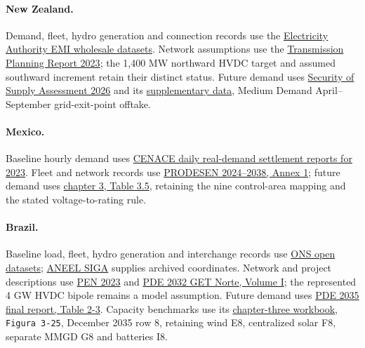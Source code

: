\documentclass[pdflatex,sn-nature]{sn-jnl}
\begin{document}
\begin{appendices}
\paragraph{New Zealand.} Demand, fleet, hydro generation and connection records use the \href{https://www.emi.ea.govt.nz/Wholesale/Datasets}{Electricity Authority EMI wholesale datasets}. Network assumptions use the \href{https://static.transpower.co.nz/public/uncontrolled_docs/TPR\%202023\%20-\%20Complete.pdf}{Transmission Planning Report 2023}; the 1,400 MW northward HVDC target and assumed southward increment retain their distinct status. Future demand uses \href{https://static.transpower.co.nz/public/bulk-upload/documents/2026\%20SOSA\%20-\%20Final\%20Report.pdf?VersionId=Lp87J8gdqEEv1qiWPGOQrC6ax06BixFp}{Security of Supply Assessment 2026} and its \href{https://static.transpower.co.nz/public/bulk-upload/documents/2026\%20SOSA\%20-\%20Final\%20Supplementary\%20Data\%20-\%20Final\%20Version.xlsx?VersionId=U0jsFRXOz4d2ZmYgOFSYhlm9bRI.pgzm}{supplementary data}, Medium Demand April--September grid-exit-point offtake.

\paragraph{Mexico.} Baseline hourly demand uses \href{https://www.cenace.gob.mx/Paginas/SIM/Reportes/EstimacionDemandaReal.aspx}{CENACE daily real-demand settlement reports for 2023}. Fleet and network records use \href{http://base.energia.gob.mx/PRODESEN2024/prodesen24-38A1.PDF}{PRODESEN 2024--2038, Annex 1}; future demand uses \href{http://base.energia.gob.mx/PRODESEN2024/prodesen24-38cap3.PDF}{chapter 3, Table 3.5}, retaining the nine control-area mapping and the stated voltage-to-rating rule.

\paragraph{Brazil.} Baseline load, fleet, hydro generation and interchange records use \href{https://dados.ons.org.br/}{ONS open datasets}; \href{https://dadosabertos.aneel.gov.br/dataset/siga-sistema-de-informacoes-de-geracao-da-aneel}{ANEEL SIGA} supplies archived coordinates. Network and project descriptions use \href{https://www.ons.org.br/AcervoDigitalDocumentosEPublicacoes/Apresenta\%C3\%A7\%C3\%A3o\%20PEN\%202023.pdf}{PEN 2023} and \href{https://www.epe.gov.br/sites-pt/areas-de-atuacao/energia-eletrica/ArquivosGrupoEstudosTransmissao/EPE-DEE-RE-021-2023-rev0\%20-\%20Diagn\%C3\%B3stico\%20-\%20PDE\%202032\%20-\%20GET\%20Norte.pdf}{PDE 2032 GET Norte, Volume I}; the represented 4 GW HVDC bipole remains a model assumption. Future demand uses \href{https://www.epe.gov.br/sites-pt/publicacoes-dados-abertos/publicacoes/Documents/PDE\%202035_Relat\%C3\%B3rio\%20Final_Aprovado.pdf}{PDE 2035 final report, Table 2-3}. Capacity benchmarks use its \href{https://www.epe.gov.br/sites-pt/publicacoes-dados-abertos/publicacoes/Documents/PDE\%202035\_Dados\_Relat\%C3\%B3rio\%20Final.zip}{chapter-three workbook}, \texttt{Figura 3-25}, December 2035 row 8, retaining wind E8, centralized solar F8, separate MMGD G8 and batteries I8.


\end{appendices}
\end{document}

